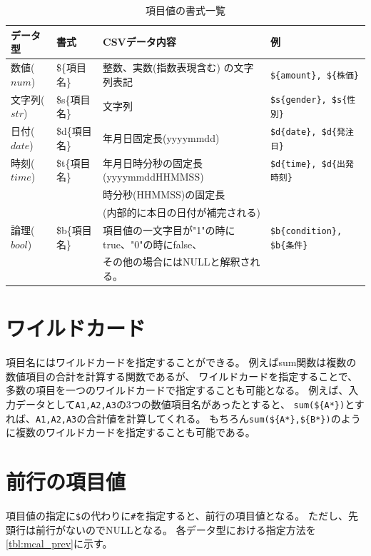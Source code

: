 \begin{table}[!hb]
\begin{center}
\caption{項目値の書式一覧\label{tbl:mcal_fld}}
{\small
  \begin{tabular}{l|l|l|l} \hline
データ型&書式&CSVデータ内容&例\\ \hline
数値($num$)   & \$\{項目名\}  & 整数、実数(指数表現含む) の文字列表記            & \verb|${amount}, ${株価}|\\
文字列($str$) & \$s\{項目名\} & 文字列                                           & \verb|$s{gender}, $s{性別}|\\
日付($date$)  & \$d\{項目名\} & 年月日固定長(yyyymmdd)                           & \verb|$d{date}, $d{発注日}| \\
時刻($time$)  & \$t\{項目名\} & 年月日時分秒の固定長(yyyymmddHHMMSS)             & \verb|$d{time}, $d{出発時刻}| \\
              &               & 時分秒(HHMMSS)の固定長                           &\\
              &               & (内部的に本日の日付が補完される)                 &\\
論理($bool$)  & \$b\{項目名\} & 項目値の一文字目が"1"の時にtrue、"0"の時にfalse、& \verb|$b{condition}, $b{条件}| \\
              &               & その他の場合にはNULLと解釈される。               & \\

\hline
  \end{tabular}
  }
  \end{center}
\end{table}

\section{ワイルドカード}
項目名にはワイルドカードを指定することができる。
例えばsum関数は複数の数値項目の合計を計算する関数であるが、
ワイルドカードを指定することで、多数の項目を一つのワイルドカードで指定することも可能となる。
例えば、入力データとして\verb|A1,A2,A3|の3つの数値項目名があったとすると、
\verb|sum(${A*})|とすれば、\verb|A1,A2,A3|の合計値を計算してくれる。
もちろん\verb|sum(${A*},${B*})|のように複数のワイルドカードを指定することも可能である。

\section{前行の項目値}
項目値の指定に\verb|$|の代わりに\verb|#|を指定すると、前行の項目値となる。
ただし、先頭行は前行がないのでNULLとなる。
各データ型における指定方法を\ref{tbl:mcal_prev}に示す。

